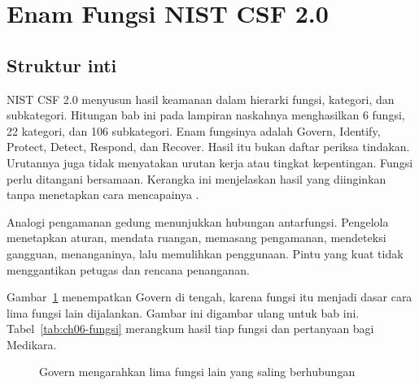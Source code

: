 \section{Enam Fungsi NIST CSF 2.0}

\subsection*{Struktur inti}

NIST CSF 2.0 menyusun hasil keamanan dalam hierarki fungsi, kategori, dan subkategori. Hitungan bab
ini pada lampiran naskahnya menghasilkan 6 fungsi, 22 kategori, dan 106 subkategori. Enam fungsinya
adalah Govern, Identify, Protect, Detect, Respond, dan Recover. Hasil itu bukan daftar periksa
tindakan. Urutannya juga tidak menyatakan urutan kerja atau tingkat kepentingan. Fungsi perlu
ditangani bersamaan. Kerangka ini menjelaskan hasil yang diinginkan tanpa menetapkan cara
mencapainya \cite{nistcsf2}.

Analogi pengamanan gedung menunjukkan hubungan antarfungsi. Pengelola menetapkan aturan, mendata
ruangan, memasang pengamanan, mendeteksi gangguan, menanganinya, lalu memulihkan penggunaan. Pintu
yang kuat tidak menggantikan petugas dan rencana penanganan.

Gambar~\ref{fig:ch06-enam-fungsi} menempatkan Govern di tengah, karena fungsi itu menjadi dasar cara
lima fungsi lain dijalankan. Gambar ini digambar ulang untuk bab ini.
Tabel~\ref{tab:ch06-fungsi} merangkum hasil tiap fungsi dan pertanyaan bagi Medikara.

\begin{figure}[!htb]
  \centering
  
  \caption{Govern mengarahkan lima fungsi lain yang saling berhubungan}
  \label{fig:ch06-enam-fungsi}
\end{figure}

